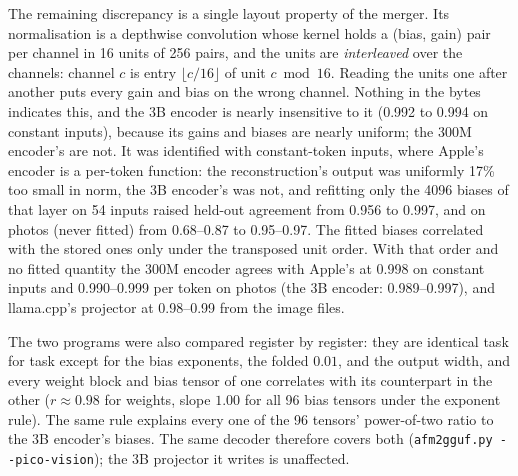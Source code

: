 \documentclass[11pt,reqno]{amsart}
\makeatletter
\newcommand{\code}[1]{\texttt{#1}}
\renewcommand\paragraph{\@startsection{paragraph}{4}\z@{.6\linespacing\@plus.2\linespacing}{-\fontdimen2\font}{\normalfont\bfseries}}
\theoremstyle{definition}
\makeatother
\begin{document}
\paragraph{The merger normalisation.} The remaining discrepancy is a single layout property of the merger. Its normalisation is a depthwise convolution whose kernel holds a (bias, gain) pair per channel in 16 units of 256 pairs, and the units are \emph{interleaved} over the channels: channel $c$ is entry $\lfloor c/16\rfloor$ of unit $c \bmod 16$. Reading the units one after another puts every gain and bias on the wrong channel. Nothing in the bytes indicates this, and the 3B encoder is nearly insensitive to it (0.992 to 0.994 on constant inputs), because its gains and biases are nearly uniform; the 300M encoder's are not. It was identified with constant-token inputs, where Apple's encoder is a per-token function: the reconstruction's output was uniformly 17\% too small in norm, the 3B encoder's was not, and refitting only the 4096 biases of that layer on 54 inputs raised held-out agreement from 0.956 to 0.997, and on photos (never fitted) from 0.68--0.87 to 0.95--0.97. The fitted biases correlated with the stored ones only under the transposed unit order. With that order and no fitted quantity the 300M encoder agrees with Apple's at 0.998 on constant inputs and 0.990--0.999 per token on photos (the 3B encoder: 0.989--0.997), and llama.cpp's projector at 0.98--0.99 from the image files.

The two programs were also compared register by register: they are identical task for task except for the bias exponents, the folded $0.01$, and the output width, and every weight block and bias tensor of one correlates with its counterpart in the other ($r\approx0.98$ for weights, slope $1.00$ for all 96 bias tensors under the exponent rule). The same rule explains every one of the 96 tensors' power-of-two ratio to the 3B encoder's biases. The same decoder therefore covers both (\code{afm2gguf.py -{}-pico-vision}); the 3B projector it writes is unaffected.
\end{document}
